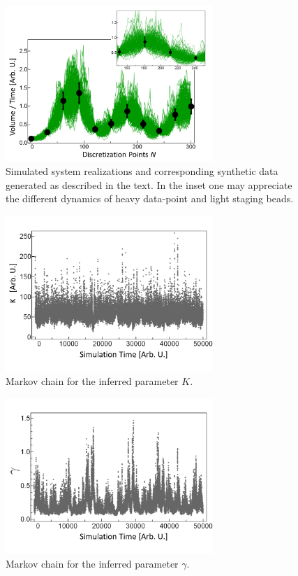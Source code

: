 \documentclass[12pt,a4paper,final]{iopart}
\begin{document}
\begin{figure}[htb!]
    \centering
    \includegraphics[width=0.7\textwidth]{Figs/FigSpaghetti.png}
    \caption{Simulated system realizations and corresponding synthetic data generated as described in the text. In the inset one may appreciate the different dynamics of heavy data-point and light staging beads.}
    \label{fig:spaghetti}
\end{figure}

\begin{figure}[htb!]
    \centering
    \includegraphics[width=0.7\textwidth]{Figs/FigChainK.png}
    \caption{Markov chain for the inferred parameter $K$.}
    \label{fig:chainK}
\end{figure}

\begin{figure}[htb!]
    \centering
    \includegraphics[width=0.7\textwidth]{Figs/FigChainG.png}
    \caption{Markov chain for the inferred parameter $\gamma$.}
    \label{fig:chainG}
\end{figure}
\end{document}

